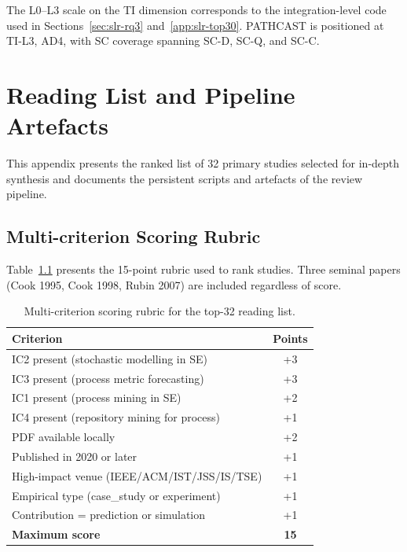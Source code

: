 The L0--L3 scale on the TI dimension corresponds to the integration-level
code used in Sections~\ref{sec:slr-rq3} and~\ref{app:slr-top30}.
PATHCAST is positioned at TI-L3, AD4, with SC coverage spanning
SC-D, SC-Q, and SC-C.


\chapter{Reading List and Pipeline Artefacts}
\label{app:I}

This appendix presents the ranked list of 32 primary studies selected for
in-depth synthesis and documents the persistent scripts and artefacts of the
review pipeline.

\section{Multi-criterion Scoring Rubric}
\label{app:slr-ranking-criteria}

Table~\ref{tab:app-ranking-criteria} presents the 15-point rubric used to rank
studies. Three seminal papers (Cook 1995, Cook 1998, Rubin 2007) are included
regardless of score.

\begin{table}[htbp]
\centering
\caption{Multi-criterion scoring rubric for the top-32 reading list.}
\label{tab:app-ranking-criteria}
\small
\setlength{\tabcolsep}{4pt}
\begin{tabular}{p{7.0cm} c}
\toprule
\textbf{Criterion} & \textbf{Points} \\
\midrule
IC2 present (stochastic modelling in SE)             & +3 \\
IC3 present (process metric forecasting)             & +3 \\
IC1 present (process mining in SE)                   & +2 \\
IC4 present (repository mining for process)          & +1 \\
PDF available locally                                & +2 \\
Published in 2020 or later                           & +1 \\
High-impact venue (IEEE/ACM/IST/JSS/IS/TSE)          & +1 \\
Empirical type (case\_study or experiment)           & +1 \\
Contribution = prediction or simulation              & +1 \\
\midrule
\textbf{Maximum score}                               & \textbf{15} \\
\bottomrule
\end{tabular}
\end{table}


